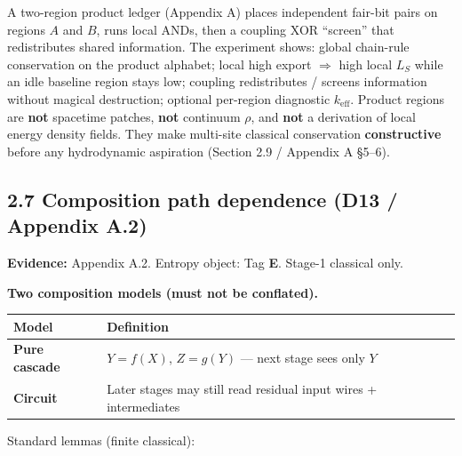 \documentclass[
  11pt,
]{article}
\newcounter{none} %
\begin{document}
A two-region product ledger (Appendix A) places independent fair-bit
pairs on regions \(A\) and \(B\), runs local ANDs, then a coupling XOR
``screen'' that redistributes shared information. The experiment shows:
global chain-rule conservation on the product alphabet; local high
export \(\Rightarrow\) high local \(L_S\) while an idle baseline region
stays low; coupling redistributes / screens information without magical
destruction; optional per-region diagnostic \(k_{\mathrm{eff}}\).
Product regions are \textbf{not} spacetime patches, \textbf{not}
continuum \(\rho\), and \textbf{not} a derivation of local energy
density fields. They make multi-site classical conservation
\textbf{constructive} before any hydrodynamic aspiration (Section 2.9 /
Appendix A §5--6).

\subsection{2.7 Composition path dependence (D13 / Appendix
A.2)}\label{composition-path-dependence-d13-appendix-a.2}

\textbf{Evidence:} Appendix A.2. Entropy object: Tag \textbf{E}. Stage-1
classical only.

\textbf{Two composition models (must not be conflated).}

{\def\LTcaptype{none} %
\begin{longtable}[]{@{}
  >{\raggedright\arraybackslash}p{}
  >{\raggedright\arraybackslash}p{}@{}}
\toprule\noalign{}
\begin{minipage}[b]{\linewidth}\raggedright
Model
\end{minipage} & \begin{minipage}[b]{\linewidth}\raggedright
Definition
\end{minipage} \\
\midrule\noalign{}
\endhead
\bottomrule\noalign{}
\endlastfoot
\textbf{Pure cascade} & \(Y=f(X)\), \(Z=g(Y)\) --- next stage sees only
\(Y\) \\
\textbf{Circuit} & Later stages may still read residual input wires +
intermediates \\
\end{longtable}
}

Standard lemmas (finite classical):
\end{document}
